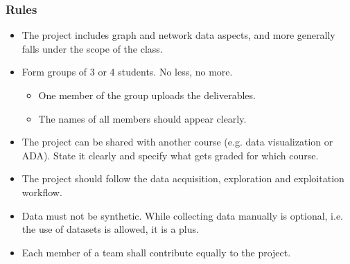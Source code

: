 \documentclass{beamer}
\begin{document}

\begin{frame}
	\frametitle{Rules}
	\begin{itemize}
		\item The project includes graph and network data aspects, and more
			generally falls under the scope of the class.
		\vfill
		\item Form groups of 3 or 4 students. No less, no more.
			\begin{itemize}
				\item One member of the group uploads the deliverables.
				\item The names of all members should appear clearly.
			\end{itemize}
		\vfill
		\item The project can be shared with another course (e.g. data
			visualization or ADA). State it clearly and specify what gets
			graded for which course.
		\item The project should follow the data acquisition, exploration and
			exploitation workflow.
		\vfill
		\item Data must not be synthetic. While collecting data manually is
			optional, i.e. the use of datasets is allowed, it is a plus.
		\vfill
		\item Each member of a team shall contribute equally to the project.
	\end{itemize}
\end{frame}

\end{document}
